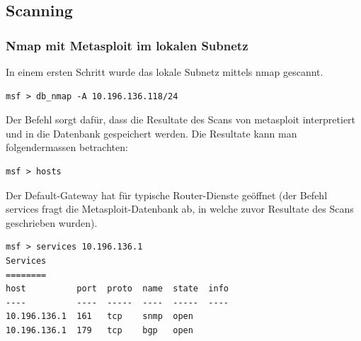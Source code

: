 \documentclass[a4paper,11pt]{scrartcl}
\begin{document}
\FloatBarrier
\subsection{Scanning}
\subsubsection{Nmap mit Metasploit im lokalen Subnetz}
In einem ersten Schritt wurde das lokale Subnetz mittels nmap gescannt.
\begin{verbatim}msf > db_nmap -A 10.196.136.118/24\end{verbatim}
Der Befehl sorgt dafür, dass die Resultate des Scans von metasploit interpretiert und in die Datenbank gespeichert werden. Die Resultate kann man folgendermassen betrachten:
\begin{verbatim}msf > hosts\end{verbatim}

Der Default-Gateway hat für typische Router-Dienste geöffnet (der Befehl services fragt die Metasploit-Datenbank ab, in welche zuvor Resultate des Scans geschrieben wurden).
\begin{lstlisting}
msf > services 10.196.136.1
Services
========
host          port  proto  name  state  info
----          ----  -----  ----  -----  ----
10.196.136.1  161   tcp    snmp  open   
10.196.136.1  179   tcp    bgp   open
\end{lstlisting}
\end{document}
